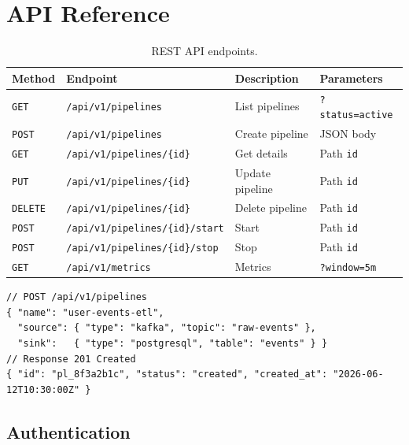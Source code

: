 \documentclass[
    language=english,
    doctype=article,
    institution=none,
]{../../omnilatex}
\begin{document}
\section{API Reference}
\label{sec:api-reference}

\begin{table}[htbp]
    \centering
    \caption{REST API endpoints.}
    \label{tab:rest-api}
    \begin{tabular}{@{}llp{4cm}p{2.5cm}@{}}
        \toprule
        \textbf{Method} & \textbf{Endpoint} & \textbf{Description} & \textbf{Parameters} \\
        \midrule
        \texttt{GET}    & \texttt{/api/v1/pipelines} & List pipelines & \texttt{?status=active} \\
        \texttt{POST}   & \texttt{/api/v1/pipelines} & Create pipeline & JSON body \\
        \texttt{GET}    & \texttt{/api/v1/pipelines/\{id\}} & Get details & Path \texttt{id} \\
        \texttt{PUT}    & \texttt{/api/v1/pipelines/\{id\}} & Update pipeline & Path \texttt{id} \\
        \texttt{DELETE} & \texttt{/api/v1/pipelines/\{id\}} & Delete pipeline & Path \texttt{id} \\
        \texttt{POST}   & \texttt{/api/v1/pipelines/\{id\}/start} & Start & Path \texttt{id} \\
        \texttt{POST}   & \texttt{/api/v1/pipelines/\{id\}/stop} & Stop & Path \texttt{id} \\
        \texttt{GET}    & \texttt{/api/v1/metrics} & Metrics & \texttt{?window=5m} \\
        \bottomrule
    \end{tabular}
\end{table}

\begin{verbatim}
// POST /api/v1/pipelines
{ "name": "user-events-etl",
  "source": { "type": "kafka", "topic": "raw-events" },
  "sink":   { "type": "postgresql", "table": "events" } }
// Response 201 Created
{ "id": "pl_8f3a2b1c", "status": "created", "created_at": "2026-06-12T10:30:00Z" }
\end{verbatim}

\subsection{Authentication}
\end{document}
